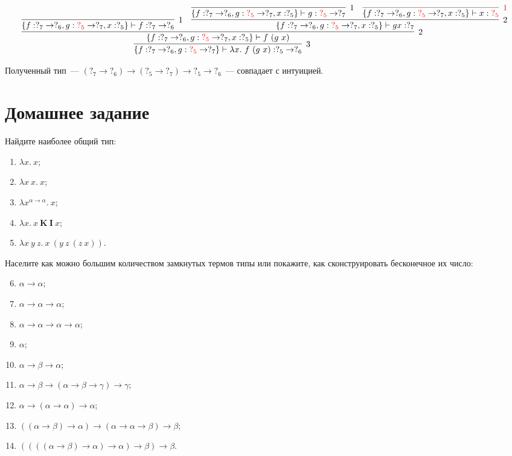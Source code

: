 \documentclass[12pt, a4paper] {article}
\begin{document}
\begin{enumerate}
{$${{      \infer[3]{\{f: ?_7 \to ?_6, g: {\color{red}?_5} \to ?_7\} \vdash \lambda x.~f~(g~x) : ?_5 \to ?_6 }{
      \infer[2]{\{f: ?_7 \to ?_6, g: {\color{red}?_5} \to ?_7, x: ?_5\} \vdash f~(g~x) }{
               \infer[1]{\{f: ?_7 \to ?_6, g: {\color{red}?_5} \to ?_7, x: ?_5\} \vdash f : ?_7 \to ?_6}{} &
      \infer[2]{\{f: ?_7 \to ?_6, g: {\color{red}?_5} \to ?_7, x: ?_5\} \vdash g x : ?_7}{
               \infer[1]{\{f: ?_7 \to ?_6, g: {\color{red}?_5} \to ?_7, x: ?_5\} \vdash g : {\color{red}?_5} \to ?_7}{} &
               {\color{red} \infer[1]{\color{defaultcolor} \{f: ?_7 \to ?_6, g: {\color{red}?_5} \to ?_7, x: ?_5\} \vdash x : {\color{red} ?_5}}{}}
      }}}}}$$}
\end{enumerate}

Полученный тип~--- $(?_7 \to ?_6) \to (?_5 \to ?_7) \to ?_5 \to ?_6$~---
совпадает с интуицией.

\section{Домашнее задание}

Найдите наиболее общий тип:

\begin{enumerate}
  \item $\lambda x.~x$;
  \item $\lambda x~x.~x$;
  \item $\lambda x^{\alpha \to \alpha}.~x$;
  \item $\lambda x.~x~\mathbf{K}~\mathbf{I}~x$;
  \item $\lambda x~y~z.~x~(y~z~(z~x))$.
\end{enumerate}

Населите как можно большим количеством замкнутых термов типы или покажите, как
сконструировать бесконечное их число:

\begin{enumerate}
\setcounter{enumi}{5}
  \item $\alpha \to \alpha$;
  \item $\alpha \to \alpha \to \alpha$;
  \item $\alpha \to \alpha \to \alpha \to \alpha$;
  \item $\alpha$;
  \item $\alpha \to \beta \to \alpha$;
  \item $\alpha \to \beta \to (\alpha \to \beta \to \gamma) \to \gamma$;
  \item $\alpha \to (\alpha \to \alpha) \to \alpha$;
  \item $((\alpha \to \beta) \to \alpha) \to (\alpha \to \alpha \to \beta) \to \beta$;
  \item $((((\alpha \to \beta) \to \alpha) \to \alpha) \to \beta) \to \beta$.
\end{enumerate}
\end{document}
